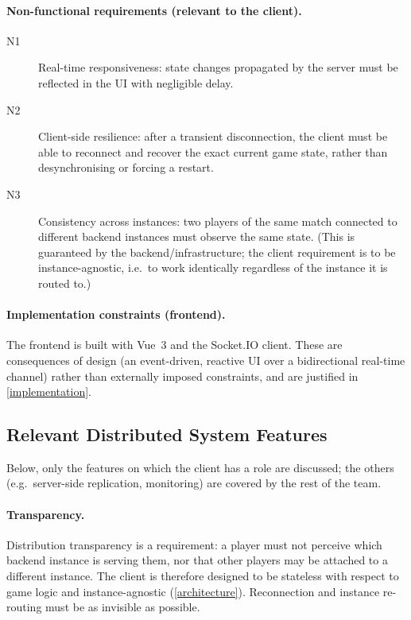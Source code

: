 \documentclass{scrartcl}
\begin{document}
\paragraph{Non-functional requirements (relevant to the client).}
\begin{description}
  \item[N1] Real-time responsiveness: state changes propagated by the
  server must be reflected in the UI with negligible delay.

  \item[N2] Client-side resilience: after a transient disconnection, the
  client must be able to reconnect and recover the exact current game
  state, rather than desynchronising or forcing a restart.

  \item[N3] Consistency across instances: two players of the same match
  connected to different backend instances must observe the same state.
  (This is guaranteed by the backend/infrastructure; the client
  requirement is to be instance-agnostic, i.e.\ to work identically
  regardless of the instance it is routed to.)
\end{description}

\paragraph{Implementation constraints (frontend).}
The frontend is built with Vue~3 and the Socket.IO client. These are
consequences of design (an event-driven, reactive UI over a
bidirectional real-time channel) rather than externally imposed
constraints, and are justified in \cref{implementation}.

\subsection{Relevant Distributed System Features}\label{ds-features}

Below, only the features on which the client has a role are discussed;
the others (e.g.\ server-side replication, monitoring) are covered by
the rest of the team.

\paragraph{Transparency.} Distribution transparency is a requirement: a
player must not perceive which backend instance is serving them, nor
that other players may be attached to a different instance. The client
is therefore designed to be stateless with respect to game logic and
instance-agnostic (\cref{architecture}). Reconnection and instance
re-routing must be as invisible as possible.
\end{document}
